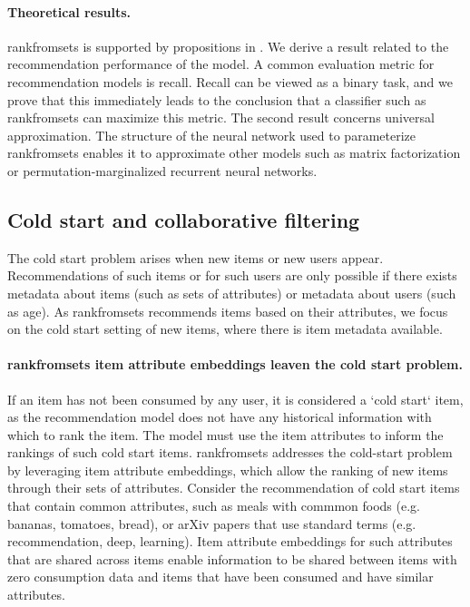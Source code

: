 \paragraph{Theoretical results.} \acrshort{rankfromsets} is supported by
propositions in . We derive a result related to the
recommendation performance of the model. A common evaluation metric for
recommendation models is recall. Recall can be viewed as a binary task, and we
prove that this immediately leads to the conclusion that a classifier such as
\acrshort{rankfromsets} can maximize this metric. The second result concerns
universal approximation. The structure of the neural network used to
parameterize \acrshort{rankfromsets} enables it to approximate other models such
as matrix factorization or permutation-marginalized recurrent neural networks.

\subsection{Cold start and collaborative filtering}

The cold start problem arises when new items or new users appear.
Recommendations of such items or for such users are only possible if there
exists metadata about items (such as sets of attributes) or metadata about users
(such as age). As \acrshort{rankfromsets} recommends items based on their
attributes, we focus on the cold start setting of new items, where there is item
metadata available.

\paragraph{\acrshort{rankfromsets} item attribute embeddings leaven the cold
  start problem.} If an item has not been consumed by any user, it is considered
a `cold start` item, as the recommendation model does not have any historical
information with which to rank the item. The model must use the item attributes
to inform the rankings of such cold start items. \acrshort{rankfromsets}
addresses the cold-start problem by leveraging item attribute embeddings, which
allow the ranking of new items through their sets of attributes. Consider the
recommendation of cold start items that contain common attributes, such as meals
with commmon foods (e.g. bananas, tomatoes, bread), or arXiv papers that use
standard terms (e.g. recommendation, deep, learning). Item attribute embeddings
for such attributes that are shared across items enable information to be shared
between items with zero consumption data and items that have been consumed and
have similar attributes.

